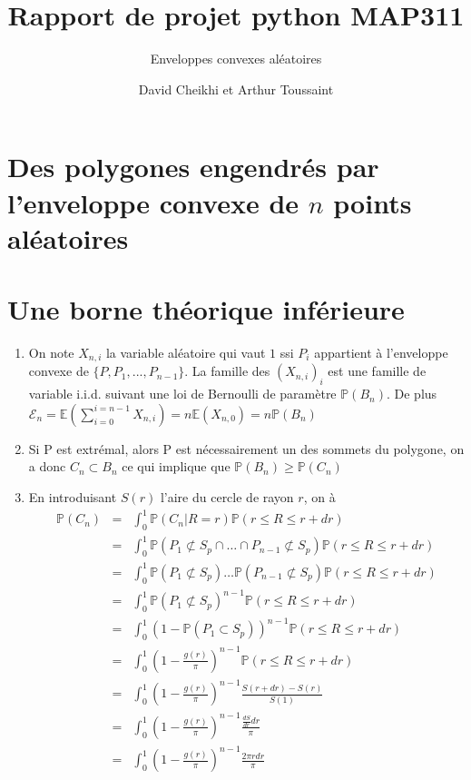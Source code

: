 \documentclass[a4paper,12pt,twoside]{article}
\title{Rapport de projet python MAP311}
\subtitle{Enveloppes convexes aléatoires}
\author{David Cheikhi et Arthur Toussaint}
\newcommand{\p}{\mathbb{P}}
\newcommand{\e}{\mathbb{E}}
\begin{document}
\maketitle

\section{Des polygones engendrés par l'enveloppe convexe de $n$ points aléatoires}
\section{Une borne théorique inférieure}
	\begin{enumerate}
		\item On note $X_{n,i}$ la variable aléatoire qui vaut $1$ ssi $P_{i}$ appartient à l'enveloppe convexe de $\{P,P_1,...,P_{n-1}\}$. La famille des $(X_{n,i})_i$ est une famille de variable i.i.d. suivant une loi de Bernoulli de paramètre $\p(B_n)$. De plus  $\mathcal{E} _n = \e(\sum_{i=0}^{i=n-1} X_{n,i}) = n\e(X_{n,0}) = n\p(B_n) $
		\item \label{extr} Si P est extrémal, alors P est nécessairement un des sommets du polygone, on a donc $C_n \subset B_n$ ce qui implique que $\p(B_n) \geq \p(C_n)$
		\item En introduisant $S(r)$ l'aire du cercle de rayon $r$, on à
		\begin{eqnarray}
			\p(C_n) &=& \int_0^1{\p(C_n | R = r) \p(r\leq R \leq r + dr)} \\
				&=& \int_0^1{\p(P_1 \not\subset S_p \cap \ldots \cap P_{n-1} \not\subset S_p)\p(r\leq R \leq r + dr)} \\
				&=& \int_0^1{\p(P_1 \not\subset S_p) \ldots \p(P_{n-1} \not\subset S_p)\p(r\leq R \leq r + dr)} \\
				&=& \int_0^1{\p(P_1 \not\subset S_p)^{n-1}\p(r\leq R \leq r + dr)} \\
				&=& \int_0^1{(1 - \p(P_1 \subset S_p))^{n-1}\p(r\leq R \leq r + dr)} \\
				&=& \int_0^1{\left( 1 - \frac{g(r)}{\pi}\right) ^{n-1}\p(r\leq R \leq r + dr)} \\
				&=& \int_0^1{\left( 1 - \frac{g(r)}{\pi}\right) ^{n-1}\frac{S(r + dr) - S(r)}{S(1)}} \\
				&=& \int_0^1{\left( 1 - \frac{g(r)}{\pi}\right) ^{n-1}\frac{\frac{dS}{dr}dr}{\pi}} \\
				&=& \int_0^1{\left( 1 - \frac{g(r)}{\pi}\right) ^{n-1}\frac{2\pi r dr}{\pi}} \\

\end{eqnarray}
\end{enumerate}
\end{document}
